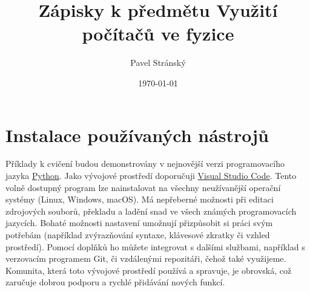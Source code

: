 \documentclass[a4paper,11pt,twoside]{article}
\theoremstyle{red}
\theoremstyle{green}
\begin{document}
\theoremstyle{spaced}
\newtheorem{example}{Příklad}[section]

\theoremstyle{blue}
\newtheorem{solution}{Řešení}[section]

\title{Zápisky k předmětu Využití počítačů ve fyzice}
\date{\today}
\author{Pavel Stránský}

\maketitle
\tableofcontents

\newcommand{\sectionbreak}{\clearpage}

\section{Instalace používaných nástrojů}
\label{sec:Instalace}
    Příklady k cvičení budou demonstrovány v nejnovější verzi programovacího jazyka \href{https://python.org}{Python}.
    Jako vývojové prostředí doporučuji \href{https://code.visualstudio.com}{Visual Studio Code}.
    Tento volně dostupný program lze nainstalovat na všechny neužívanější operační systémy (Linux, Windows, macOS).    
    Má nepřeberné možnosti při editaci zdrojových souborů, překladu a ladění snad ve všech známých programovacích jazycích.
    Bohaté možnosti nastavení umožnují přizpůsobit si práci svým potřebám (například zvýrazňování syntaxe, klávesové zkratky či vzhled prostředí).
    Pomocí doplňků ho můžete integrovat s dalšími službami, například s verzovacím programem Git, či vzdálenými repozitáři, čehož také využijeme.
    Komunita, která toto vývojové prostředí používá a spravuje, je obrovská, což zaručuje dobrou podporu a rychlé přidávání nových funkcí.
\end{document}
